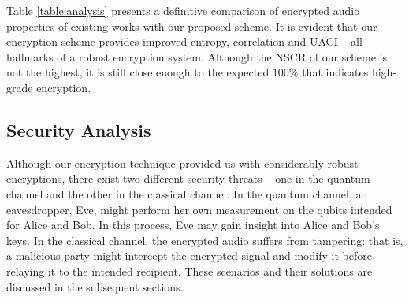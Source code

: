 \documentclass[a4paper]{cas-sc}
\begin{document}
Table \ref{table:analysis} presents a definitive comparison of encrypted audio properties of existing works with our proposed scheme. It is evident that our encryption scheme provides improved entropy, correlation and UACI -- all hallmarks of a robust encryption system. Although the NSCR of our scheme is not the highest, it is still close enough to the expected $100\%$ that indicates high-grade encryption.
\subsection{Security Analysis}
Although our encryption technique provided us with considerably robust encryptions, there exist two different security threats -- one in the quantum channel and the other in the classical channel. In the quantum channel, an eavesdropper, Eve, might perform her own measurement on the qubits intended for Alice and Bob. In this process, Eve may gain insight into Alice and Bob's keys. In the classical channel, the encrypted audio suffers from tampering; that is, a malicious party might intercept the encrypted signal and modify it before relaying it to the intended recipient. These scenarios and their solutions are discussed in the subsequent sections.
\end{document}
